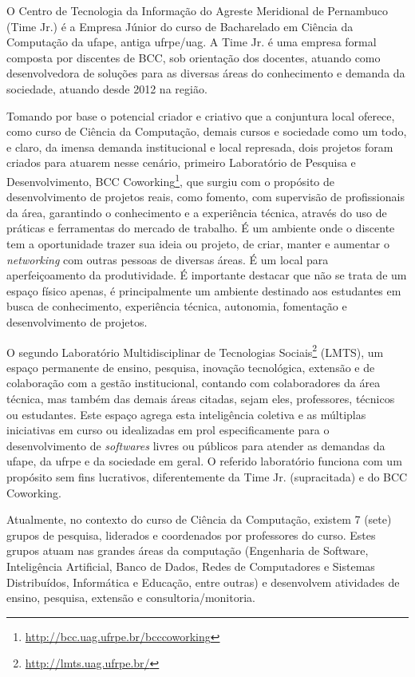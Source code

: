 \documentclass[
	12pt,				%
	openright,			%
  oneside,     %
	a4paper,			%
 hyphens,
	chapter=TITLE,		%
	english,			%
	french,				%
	spanish,			%
	brazil				%
	]{abntex2}
\begin{document}
O Centro de Tecnologia da Informação do Agreste Meridional de Pernambuco (Time Jr.) é a Empresa Júnior do curso de Bacharelado em Ciência da Computação da \acrshort{ufape}, antiga \acrshort{ufrpe}/\acrshort{uag}. A Time Jr. é uma empresa formal composta por discentes de BCC, sob orientação dos docentes, atuando como desenvolvedora de soluções para as diversas áreas do conhecimento e demanda da sociedade, atuando desde 2012 na região. 

Tomando por base o potencial criador e criativo que a conjuntura local oferece, como curso de Ciência da Computação, demais cursos e sociedade como um todo, e claro, da imensa demanda institucional e local represada, dois projetos foram criados para atuarem nesse cenário,  primeiro Laboratório de Pesquisa e Desenvolvimento, BCC Coworking\footnote{\url{http://bcc.uag.ufrpe.br/bcccoworking}}, que surgiu com o propósito de desenvolvimento de projetos reais, como fomento, com supervisão de profissionais da área, garantindo o conhecimento e a experiência técnica, através do uso de práticas e ferramentas do mercado de trabalho. É um ambiente onde o discente tem a oportunidade trazer sua ideia ou projeto, de criar, manter e aumentar o \textit{networking} com outras pessoas de diversas áreas. É um local para aperfeiçoamento da produtividade. É importante destacar que não se trata de um espaço físico apenas, é principalmente um ambiente destinado aos estudantes em busca de conhecimento, experiência técnica, autonomia, fomentação e desenvolvimento de projetos. 

O segundo Laboratório Multidisciplinar de Tecnologias Sociais\footnote{\url{http://lmts.uag.ufrpe.br/}} (LMTS),  um espaço permanente de ensino, pesquisa, inovação tecnológica, extensão e de colaboração com a gestão institucional, contando com colaboradores da área técnica, mas também das demais áreas citadas, sejam eles, professores, técnicos ou estudantes. Este espaço agrega esta inteligência coletiva e as múltiplas iniciativas em curso ou idealizadas em prol especificamente para o desenvolvimento de \textit{softwares} livres ou públicos para atender as demandas da \acrshort{ufape}, da \acrshort{ufrpe} e da sociedade em geral. O referido laboratório funciona com um propósito sem fins lucrativos, diferentemente da Time Jr. (supracitada) e do BCC Coworking.

Atualmente, no contexto do curso de Ciência da Computação, existem 7 (sete) grupos de pesquisa, liderados e coordenados por professores do curso. Estes grupos atuam nas grandes áreas da computação (Engenharia de Software, Inteligência Artificial, Banco de Dados, Redes de Computadores e Sistemas Distribuídos, Informática e Educação, entre outras) e desenvolvem atividades de ensino, pesquisa, extensão e consultoria/monitoria.
\end{document}
